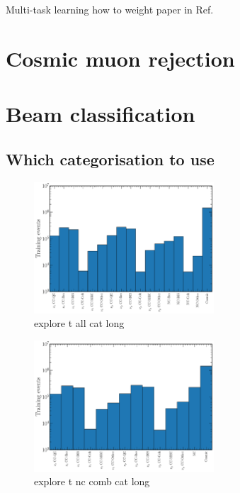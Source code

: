 Multi-task learning how to weight paper in Ref.~\cite{kendall2017}

\section{Cosmic muon rejection} %
\label{sec:cvn_cosmic} %

\section{Beam classification} %
\label{sec:cvn_beam} %

\subsection{Which categorisation to use} %
\label{sec:cvn_beam_cat} %

\begin{figure} %
    \includegraphics[width=0.6\textwidth]{diagrams/7-cvn/chipsnet/explore_t_all_cat.pdf}
    \caption[explore t all cat short]
    {explore t all cat long}
    \label{fig:explore_t_all_cat}
\end{figure}

\begin{figure} %
    \includegraphics[width=0.6\textwidth]{diagrams/7-cvn/chipsnet/explore_t_nc_comb_cat.pdf}
    \caption[explore t nc comb cat short]
    {explore t nc comb cat long}
    \label{fig:explore_t_nc_comb_cat}
\end{figure}

